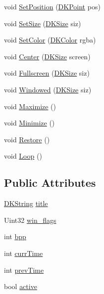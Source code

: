 \begin{DoxyCompactItemize}
\item 
void \hyperlink{class_d_k_frame_aee5b76f7b0d8c61c69eec57a14efaa0d}{Set\-Position} (\hyperlink{_d_k_axis_8h_a0ca1f005fbb936f8e7a7f2433591f418}{D\-K\-Point} pos)
\item 
void \hyperlink{class_d_k_frame_acbd590777acaa47a9c44fcff73b21ae9}{Set\-Size} (\hyperlink{_d_k_axis_8h_aaa25a8c7cbf504fffdb8a4208ff7a731}{D\-K\-Size} siz)
\item 
void \hyperlink{class_d_k_frame_a392ace661d25b643760c1b9aa1f39814}{Set\-Color} (\hyperlink{class_d_k_color}{D\-K\-Color} rgba)
\item 
void \hyperlink{class_d_k_frame_a037795522f9ed5c021c73830172a48da}{Center} (\hyperlink{_d_k_axis_8h_aaa25a8c7cbf504fffdb8a4208ff7a731}{D\-K\-Size} screen)
\item 
void \hyperlink{class_d_k_frame_a9e2b79d264394b823ae54c8d3a09f3a3}{Fullscreen} (\hyperlink{_d_k_axis_8h_aaa25a8c7cbf504fffdb8a4208ff7a731}{D\-K\-Size} siz)
\item 
void \hyperlink{class_d_k_frame_a01091bd3de40ea339155e74688a975ed}{Windowed} (\hyperlink{_d_k_axis_8h_aaa25a8c7cbf504fffdb8a4208ff7a731}{D\-K\-Size} siz)
\item 
void \hyperlink{class_d_k_frame_a14ca6b53b882a1bd5efea2dd957554e0}{Maximize} ()
\item 
void \hyperlink{class_d_k_frame_a4d00584a18d73052f9769760c2852504}{Minimize} ()
\item 
void \hyperlink{class_d_k_frame_a4930671038ac88e628bd8cacf86b4d1a}{Restore} ()
\item 
void \hyperlink{class_d_k_frame_a1c8e2fe5cd630d15784be3168a1bdfd3}{Loop} ()
\end{DoxyCompactItemize}
\subsection*{Public Attributes}
\begin{DoxyCompactItemize}
\item 
\hyperlink{_d_k_string_8h_ac168e8555ceba18e1a2919b21976bc84}{D\-K\-String} \hyperlink{class_d_k_frame_ab17b09cc37e0dc902e3a351891dbcff5}{title}
\item 
Uint32 \hyperlink{class_d_k_frame_a84d0766442bdae51207d85b6d7d6fbd2}{win\-\_\-flags}
\item 
int \hyperlink{class_d_k_frame_aba8b2946d5f886240e27d4e8eed8aaed}{bpp}
\item 
int \hyperlink{class_d_k_frame_a1050bec9188e541d412287dd737ac029}{curr\-Time}
\item 
int \hyperlink{class_d_k_frame_aaa2e4b4b32854de1866cc7989cae4383}{prev\-Time}
\item 
bool \hyperlink{class_d_k_frame_a3a0f10c92be22c69d8469b4b09a7ec80}{active}
\end{DoxyCompactItemize}
